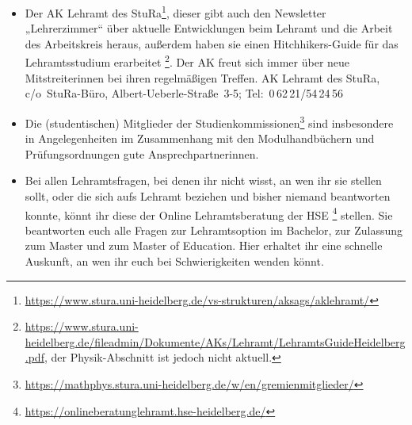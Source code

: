 \begin{itemize}
\item Der AK Lehramt des StuRa\footnote{\url{https://www.stura.uni-heidelberg.de/vs-strukturen/aksags/aklehramt/}}, dieser gibt auch den Newsletter „Lehrerzimmer“ über aktuelle Entwicklungen beim Lehramt und die Arbeit des Arbeitskreis heraus, außerdem haben sie einen Hitchhikers-Guide für das Lehramtsstudium erarbeitet \footnote{\url{https://www.stura.uni-heidelberg.de/fileadmin/Dokumente/AKs/Lehramt/LehramtsGuideHeidelberg.pdf}, der Physik-Abschnitt ist jedoch nicht aktuell.}. Der AK freut sich immer über neue Mitstreiterinnen bei ihren regelmäßigen Treffen.  \newline AK Lehramt des StuRa, c/o~StuRa-Büro, Albert-Ueberle-Straße~3-5; Tel:~0\,62\,21/54\,24\,56

\item Die (studentischen) Mitglieder der Studienkommissionen\footnote{\url{https://mathphys.stura.uni-heidelberg.de/w/en/gremienmitglieder/}} sind insbesondere in Angelegenheiten im Zusammenhang mit den Modulhandbüchern und Prüfungsordnungen gute Ansprechpartnerinnen.

\item Bei allen Lehramtsfragen, bei denen ihr nicht wisst, an wen ihr sie stellen sollt, oder die sich aufs Lehramt beziehen und bisher niemand beantworten konnte, könnt ihr diese der Online Lehramtsberatung der HSE \footnote{\url{https://onlineberatunglehramt.hse-heidelberg.de/}} stellen. Sie beantworten euch alle Fragen zur Lehramtsoption im Bachelor, zur Zulassung zum Master und zum Master of Education. Hier erhaltet ihr eine schnelle Auskunft, an wen ihr euch bei Schwierigkeiten wenden könnt.


\end{itemize}


